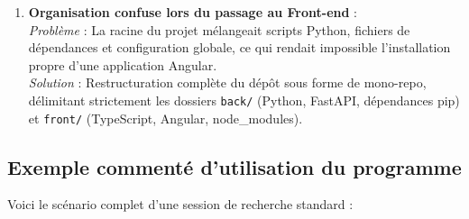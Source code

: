 \documentclass[12pt,a4paper]{article}
\begin{document}
\begin{enumerate}[leftmargin=*, label=\textbf{P\arabic*.}]
    \item \textbf{Organisation confuse lors du passage au Front-end} :\\
    \textit{Problème} : La racine du projet mélangeait scripts Python, fichiers de dépendances et configuration globale, ce qui rendait impossible l'installation propre d'une application Angular.\\
    \textit{Solution} : Restructuration complète du dépôt sous forme de mono-repo, délimitant strictement les dossiers \texttt{back/} (Python, FastAPI, dépendances pip) et \texttt{front/} (TypeScript, Angular, node\_modules).
\end{enumerate}

\newpage

\subsection{Exemple commenté d'utilisation du programme}

Voici le scénario complet d'une session de recherche standard :
\end{document}

